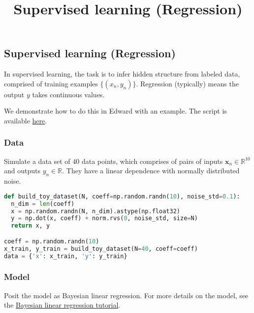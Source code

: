 \title{Supervised learning (Regression)}

\subsection{Supervised learning (Regression)}

In supervised learning, the task is to infer hidden structure from
labeled data, comprised of training examples $\{(x_n, y_n)\}$.
Regression (typically) means the output $y$ takes continuous values.

We demonstrate how to do this in Edward with an example.
The script is available
\href{https://github.com/blei-lab/edward/blob/master/examples/bayesian_linear_regression_test.py}
{here}.


\subsubsection{Data}

Simulate a data set of $40$ data points, which comprises of pairs of inputs $\mathbf{x}_n\in\mathbb{R}^{10}$ and outputs
$y_n\in\mathbb{R}$. They have a linear dependence with normally distributed noise.

\begin{lstlisting}[language=Python]
def build_toy_dataset(N, coeff=np.random.randn(10), noise_std=0.1):
  n_dim = len(coeff)
  x = np.random.randn(N, n_dim).astype(np.float32)
  y = np.dot(x, coeff) + norm.rvs(0, noise_std, size=N)
  return x, y

coeff = np.random.randn(10)
x_train, y_train = build_toy_dataset(N=40, coeff=coeff)
data = {'x': x_train, 'y': y_train}
\end{lstlisting}


\subsubsection{Model}

Posit the model as Bayesian linear regression. For more details on the
model, see the
\href{tut_bayesian_linear_regression.html}
{Bayesian linear regression tutorial}.

